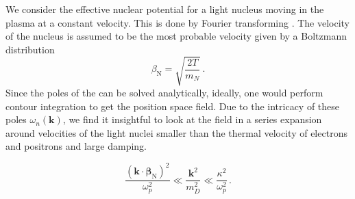 \label{sec:DDS}
We consider the effective nuclear potential for a light nucleus moving in the plasma at a constant velocity. This is done by Fourier transforming . The velocity of the nucleus is assumed to be the most probable velocity given by a Boltzmann distribution
\begin{equation}\label{eq:vel}
 \beta_{\text{N}} = \sqrt{\frac{2T}{m_N}}\,. 
\end{equation}
Since the poles of the  can be solved analytically, ideally, one would perform contour integration to get the position space field. Due to the intricacy of these poles $\omega_n(\boldsymbol{k})$, we find it insightful to look at the field in a series expansion around velocities of the light nuclei smaller than the thermal velocity of electrons and positrons and large damping.

\begin{equation}\label{eq:expansion}
\frac{(\boldsymbol{k}\cdot\boldsymbol{\beta}_{\text{N}})^2}{\omega_p^2} \ll \frac{\boldsymbol{k}^2}{m_D^2} \ll \frac{\kappa^2}{\omega_p^2}\, .
\end{equation}


